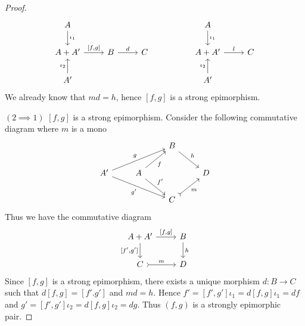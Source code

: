 \begin{subbox}{}
\begin{proof}
\[
\begin{tikzcd}
    A \arrow[d, "\iota_1"]    &                  &   &  & A \arrow[d, "\iota_1"]  &   \\
    A+A' \arrow[r, "{[f,g]}"] & B \arrow[r, "d"] & C &  & A+A' \arrow[r, "l"]     & C \\
    A' \arrow[u, "\iota_2"]   &                  &   &  & A' \arrow[u, "\iota_2"] &  
    \end{tikzcd}
\]
We already know that $md=h$, hence $[f,g]$ is a strong epimorphism.

$(2 \implies 1)$ $[f,g]$ is a strong epimorphism. Consider the following commutative diagram where $m$ is a mono
\[
\begin{tikzcd}
    &                                     & B \arrow[rd, "h"]        &   \\
A' \arrow[rru, "g"] \arrow[rrd, "g'"'] & A \arrow[ru, "f"'] \arrow[rd, "f'"] &                          & D \\
    &                                     & C \arrow[ru, "m"', tail] &  
\end{tikzcd}
\]
Thus we have the commutative diagram
\[
\begin{tikzcd}
    A+A' \arrow[r, "{[f,g]}"] \arrow[d, "{[f',g']}"'] & B \arrow[d, "h"] \\
    C \arrow[r, "m", tail]                            & D               
    \end{tikzcd}
\]
Since $[f,g]$ is a strong epimorphism, there exists a unique morphism $d: B \to C$ such that $d[f,g]=[f'.g']$ and $md=h$. Hence $f'=[f',g']\iota_1=d[f,g]\iota_1=df$ and $g'=[f',g']\iota_2=d[f,g]\iota_2=dg$. Thus $(f,g)$ is a strongly epimorphic pair.
    \end{proof}
\end{subbox}

